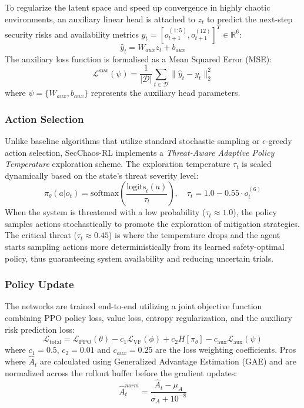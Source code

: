 \documentclass[pdflatex,sn-mathphys-num]{sn-jnl}%
\theoremstyle{thmstyleone}%
\theoremstyle{thmstyletwo}%
\theoremstyle{thmstylethree}%
\begin{document}
	 To regularize the latent space and speed up convergence in highly chaotic environments, an auxiliary linear head is attached to $z_t$ to predict the next-step security risks and availability metrics $y_t = [o_{t+1}^{(1:5)}, o_{t+1}^{(12)}]^T \in \mathbb{R}^6$:
	\begin{equation}
		\hat{y}_t = W_{aux} z_t + b_{aux}
	\end{equation}
	The auxiliary loss function is formalised as a Mean Squared Error (MSE):
	\begin{equation}
		\mathcal{L}^{aux}(\psi) = \frac{1}{|\mathcal{D}|}\sum_{t \in \mathcal{D}} \|\hat{y}_t - y_t\|_2^2
	\end{equation}
	where $\psi = \{W_{aux}, b_{aux}\}$ represents the auxiliary head parameters.
	
	\subsubsection{Action Selection}
	
	Unlike baseline algorithms that utilize standard stochastic sampling or $\epsilon$-greedy action selection, SecChaos-RL implements a \textit{Threat-Aware Adaptive Policy Temperature} exploration scheme. The exploration temperature $\tau_t$ is scaled dynamically based on the state's threat severity level:
	\begin{equation}
		\pi_\theta(a|o_t) = \text{softmax}\left(\frac{\text{logits}_t(a)}{\tau_t}\right), \quad \tau_t = 1.0 - 0.55 \cdot o_t^{(6)}
	\end{equation}
	When the system is threatened with a low probability ($\tau_t \approx 1.0$), the policy samples actions stochastically to promote the exploration of mitigation strategies. The critical threat ($\tau_t \approx 0.45$) is where the temperature drops and the agent starts sampling actions more deterministically from its learned safety-optimal policy, thus guaranteeing system availability and reducing uncertain trials. 
	
	\subsubsection{Policy Update}
	
	The networks are trained end-to-end utilizing a joint objective function combining PPO policy loss, value loss, entropy regularization, and the auxiliary risk prediction loss:
	\begin{equation}
		\mathcal{L}_{\text{total}} = \mathcal{L}_{\text{PPO}}(\theta) - c_1 \mathcal{L}_{\text{VF}}(\phi) + c_2 H[\pi_\theta] - c_{\text{aux}} \mathcal{L}_{\text{aux}}(\psi)
	\end{equation}
	where $c_1=0.5$, $c_2=0.01$ and $c_{aux}=0.25$ are the loss weighting coefficients. Pros where $\hat{A}_t$ are calculated using Generalized Advantage Estimation (GAE) and are normalized across the rollout buffer before the gradient updates: 
	\begin{equation}
		\hat{A}_t^{norm} = \frac{\hat{A}_t - \mu_A}{\sigma_A + 10^{-8}}
	\end{equation}
	
\end{document}
